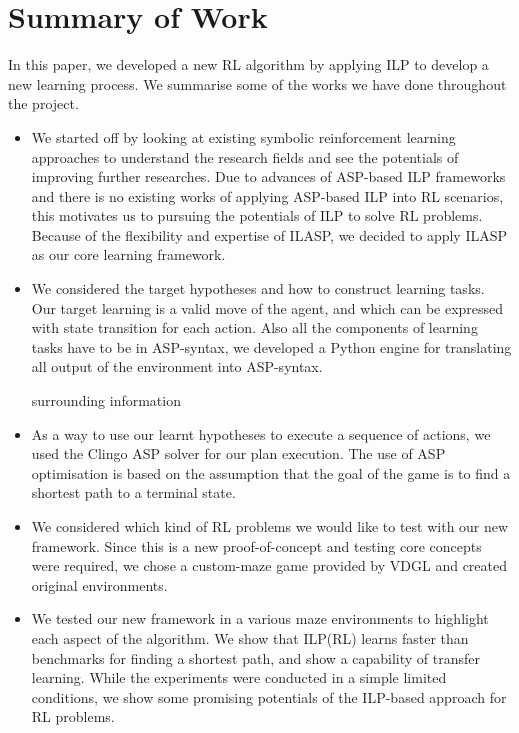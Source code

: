 \section{Summary of Work}
\label{sec:summary_of_work}

In this paper, we developed a new RL algorithm by applying ILP to develop a new learning process.
We summarise some of the works we have done throughout the project.

\begin{itemize}
\item We started off by looking at existing symbolic reinforcement learning approaches to understand the research fields and see the potentials of improving further researches.
Due to advances of ASP-based ILP frameworks and there is no existing works of applying ASP-based ILP into RL scenarios, this motivates us to pursuing the potentials of ILP to solve RL problems.
Because of the flexibility and expertise of ILASP, we decided to apply ILASP as our core learning framework.

\item We considered the target hypotheses and how to construct learning tasks. Our target learning is a valid move of the agent, and which can be expressed with state transition for each action.
Also all the components of learning tasks have to be in ASP-syntax, we developed a Python engine for translating all output of the environment into ASP-syntax.

surrounding information

\item As a way to use our learnt hypotheses to execute a sequence of actions, we used the Clingo ASP solver for our plan execution. 
The use of ASP optimisation is based on the assumption that the goal of the game is to find a shortest path to a terminal state.

\item We considered which kind of RL problems we would like to test with our new framework. Since this is a new proof-of-concept and testing core concepts were required, we chose a custom-maze game provided by VDGL and created original environments.

\item We tested our new framework in a various maze environments to highlight each aspect of the algorithm. We show that ILP(RL) learns faster than benchmarks for finding a shortest path, and show a capability of transfer learning.
While the experiments were conducted in a simple limited conditions, we show some promising potentials of the ILP-based approach for RL problems.

\end{itemize}

